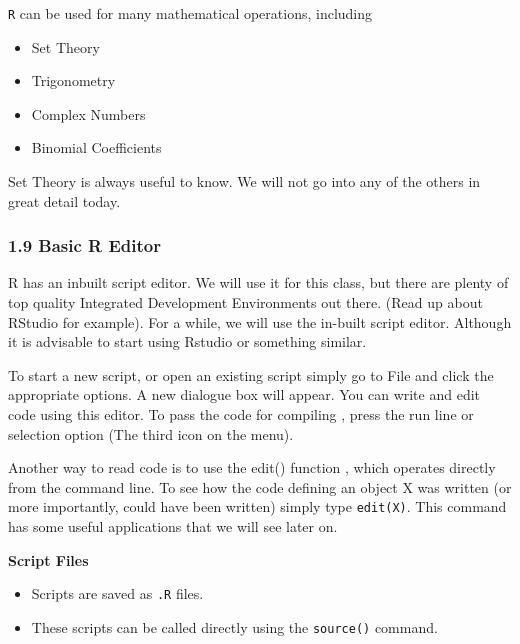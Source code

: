 \documentclass{beamer}
\begin{document}
 	\begin{frame}
 		
 		\texttt{R} can be used for many mathematical operations, including
 		
 		\begin{itemize}
 			\item Set Theory
 			\item Trigonometry
 			\item Complex Numbers
 			\item Binomial Coefficients
 		\end{itemize}
 		Set Theory is always useful to know. We will not go into any of the others in great detail today.
 	\end{frame}
 	\begin{frame}
 		\frametitle{1.9 Basic R Editor}
 		R has an inbuilt script editor. We will use it for this class, but there are plenty of top quality
 		Integrated Development Environments out there. (Read up about RStudio for example).
 		For a while, we will use the in-built script editor. Although it is advisable to start using Rstudio or something similar.
 		
 	\end{frame}
 	\begin{frame}
 		
 		
 		To start a new script, or open an existing script simply go to File and click the appropriate
 		options. A new dialogue box will appear. You can write and edit code using this editor.
 		To pass the code for compiling , press the run line or selection option (The third icon
 		on the menu).
 		
 	\end{frame}
 	\begin{frame}
 		
 		Another way to read code is to use the edit() function , which operates directly from the
 		command line. To see how the code defining an object X was written (or more importantly,
 		could have been written) simply type \texttt{edit(X)}. This command has some useful applications
 		that we will see later on.
 		
 	\end{frame}
 	\begin{frame}
 		
 		\textbf{Script Files}
 		\begin{itemize}
 			\item Scripts are saved as \texttt{.R} files. 
 			\item These scripts can be called directly using the \texttt{source()} command.
 		\end{itemize}
 	\end{frame}
 	
\end{document}
